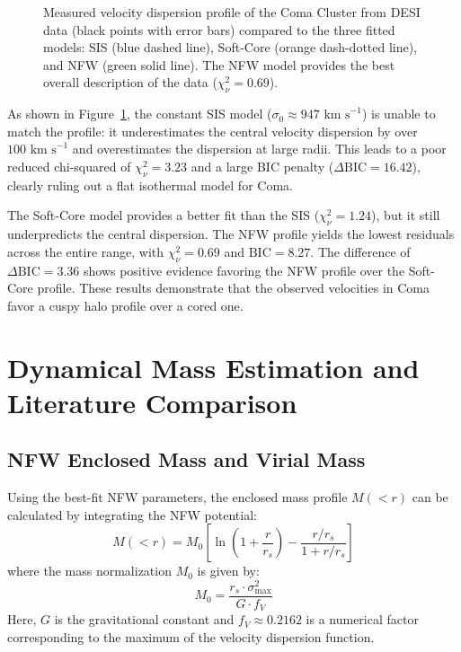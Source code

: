 \documentclass[twocolumn]{aastex631}
\begin{document}
\begin{figure}[ht!]
	\centering
	\caption{Measured velocity dispersion profile of the Coma Cluster from DESI data (black points with error bars) compared to the three fitted models: SIS (blue dashed line), Soft-Core (orange dash-dotted line), and NFW (green solid line). The NFW model provides the best overall description of the data ($\chi_\nu^2 = 0.69$).}
	\label{fig:model_fit}
\end{figure}

As shown in Figure~\ref{fig:model_fit}, the constant SIS model ($\sigma_0 \approx 947\text{ km s}^{-1}$) is unable to match the profile: it underestimates the central velocity dispersion by over $100\text{ km s}^{-1}$ and overestimates the dispersion at large radii. This leads to a poor reduced chi-squared of $\chi_\nu^2 = 3.23$ and a large BIC penalty ($\Delta\text{BIC} = 16.42$), clearly ruling out a flat isothermal model for Coma.

The Soft-Core model provides a better fit than the SIS ($\chi_\nu^2 = 1.24$), but it still underpredicts the central dispersion. The NFW profile yields the lowest residuals across the entire range, with $\chi_\nu^2 = 0.69$ and $\text{BIC} = 8.27$. The difference of $\Delta\text{BIC} = 3.36$ shows positive evidence favoring the NFW profile over the Soft-Core profile. These results demonstrate that the observed velocities in Coma favor a cuspy halo profile over a cored one.

\section{Dynamical Mass Estimation and Literature Comparison} \label{sec:mass_estimation}

\subsection{NFW Enclosed Mass and Virial Mass}
Using the best-fit NFW parameters, the enclosed mass profile $M(<r)$ can be calculated by integrating the NFW potential:
\begin{equation}
	M(<r) = M_0 \left[\ln\left(1 + \frac{r}{r_s}\right) - \frac{r/r_s}{1 + r/r_s}\right]
\end{equation}
where the mass normalization $M_0$ is given by:
\begin{equation}
	M_0 = \frac{r_s \cdot \sigma_{\text{max}}^2}{G \cdot f_V}
\end{equation}
Here, $G$ is the gravitational constant and $f_V \approx 0.2162$ is a numerical factor corresponding to the maximum of the velocity dispersion function.
\end{document}
